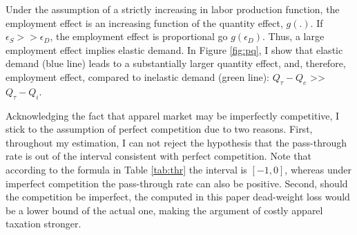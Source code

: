 \documentclass[12pt]{article}
\begin{document}
			Under the assumption of a strictly increasing in labor production function, the employment effect is an increasing function of the quantity effect, $g(.)$. If $\epsilon_S>>\epsilon_D$, the employment effect is proportional go $g(\epsilon_D)$. Thus, a large employment effect implies elastic demand. In Figure \ref{fig:pq}, I show that elastic demand (blue line) leads to a substantially larger quantity effect, and, therefore, employment effect, compared to inelastic demand (green line): $Q_\tau-Q_e$ >> $Q_\tau-Q_i$.
			
			Acknowledging the fact that apparel market may be imperfectly competitive, I stick to the assumption of perfect competition due to two reasons. First, throughout my estimation, I can not reject the hypothesis that the pass-through rate is out of the interval consistent with perfect competition. Note that according to the formula in Table \ref{tab:thr} the interval is $[-1,0]$, whereas under imperfect competition the pass-through rate can also be positive. Second, should the competition be imperfect, the computed in this paper dead-weight loss would be a lower bound of the actual one, making the argument of costly apparel taxation stronger.
			
			
			
			
			
\end{document}
